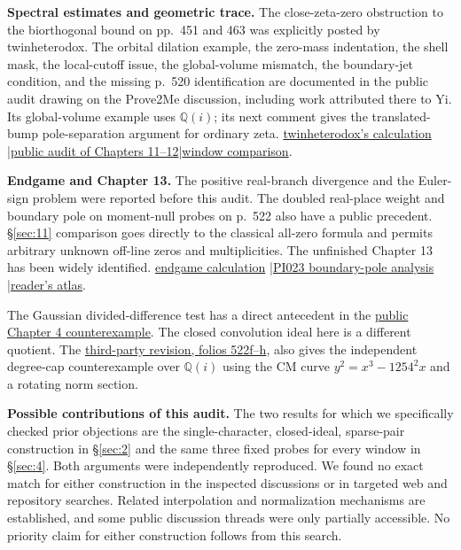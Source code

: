 \documentclass[11pt,reqno]{amsart}
\numberwithin{equation}{section}
\newcommand{\Q}{\mathbb Q}\newcommand{\R}{\mathbb R}\newcommand{\C}{\mathbb C}\newcommand{\Z}{\mathbb Z}
\newcommand{\prior}{\href{https://github.com/mccorvie/riemann-masullo/issues/2469\#issuecomment-7057757662}{public audit of Chapters 11--12}}
\begin{document}
\textbf{Spectral estimates and geometric trace.} The close-zeta-zero obstruction to the biorthogonal bound on pp.~451 and 463 was explicitly posted by twinheterodox. The orbital dilation example, the zero-mass indentation, the shell mask, the local-cutoff issue, the global-volume mismatch, the boundary-jet condition, and the missing p.~520 identification are documented in the public audit drawing on the Prove2Me discussion, including work attributed there to Yi. Its global-volume example uses \(\Q(i)\); its next comment gives the translated-bump pole-separation argument for ordinary zeta. \href{https://terrytao.wordpress.com/2026/11/20/unforced-euler-singularity-unforced-navier-stokes-singularity-and-the-generalized-riemann-hypothesis/\#comment-699655}{twinheterodox's calculation} \enspace|\enspace \prior \enspace|\enspace \href{https://github.com/mccorvie/riemann-masullo/issues/2469\#issuecomment-7057757877}{window comparison}.

\textbf{Endgame and Chapter 13.} The positive real-branch divergence and the Euler-sign problem were reported before this audit. The doubled real-place weight and boundary pole on moment-null probes on p.~522 also have a public precedent. \S\ref{sec:11} comparison goes directly to the classical all-zero formula and permits arbitrary unknown off-line zeros and multiplicities. The unfinished Chapter 13 has been widely identified. \href{https://github.com/mccorvie/riemann-masullo/issues/3\#issuecomment-7048799269}{endgame calculation} \enspace|\enspace \href{https://github.com/monocap-tech/weil-lab/blob/2f94e280ac7bf3a567f7d4ca54898551d867a4f6/docs/PI023_CANONICAL_HAAR_AND_BOUNDARY_POLE_NO_GO.md}{PI023 boundary-pole analysis} \enspace|\enspace \href{https://rlankenau.github.io/rh/masullo/}{reader's atlas}.

The Gaussian divided-difference test has a direct antecedent in the \href{https://github.com/mccorvie/riemann-masullo/issues/36\#issuecomment-7058116453}{public Chapter 4 counterexample}. The closed convolution ideal here is a different quotient. The \href{https://github.com/Titulus233/The-Music-of-the-Primes-Revise/blob/4a9ad5765d4a2dfb237f874695ee4f4a07817867/src/the-music-of-the-primes-revised.tex}{third-party revision, folios 522f--h}, also gives the independent degree-cap counterexample over \(\Q(i)\) using the CM curve \(y^2=x^3-1254^2x\) and a rotating norm section.

\textbf{Possible contributions of this audit.} The two results for which we specifically checked prior objections are the single-character, closed-ideal, sparse-pair construction in \S\ref{sec:2} and the same three fixed probes for every window in \S\ref{sec:4}. Both arguments were independently reproduced. We found no exact match for either construction in the inspected discussions or in targeted web and repository searches. Related interpolation and normalization mechanisms are established, and some public discussion threads were only partially accessible. No priority claim for either construction follows from this search.
\end{document}
